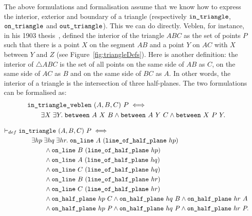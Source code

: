 The above formulations and formalisation assume that we know how to express the interior, exterior and boundary of a triangle (respectively $\texttt{in\_triangle}$, $\texttt{on\_triangle}$ and $\texttt{out\_triangle}$). This we can do directly. Veblen, for instance, in his 1903 thesis~\cite{Veblenphd}, defined the interior of the triangle $ABC$ as the set of points $P$ such that there is a point $X$ on the segment $AB$ and a point $Y$ on $AC$ with $X$ between $Y$ and $Z$ (see Figure~\ref{fig:triangleDefs}). Here is another definition: the interior of $\triangle ABC$ is the set of all points on the same side of $AB$ as $C$, on the same side of $AC$ as $B$ and on the same side of $BC$ as $A$. In other words, the interior of a triangle is the intersection of three half-planes. The two formulations can be formalised as:
\begin{equation*}
\begin{split}
  &\texttt{in\_triangle\_veblen}\ (A,B,C)\ P \iff\\
  &\qquad\exists X\;\exists Y.\; \texttt{between}\ A\ X\ B \wedge \texttt{between}\ A\ Y\ C \wedge \texttt{between}\ X\ P\ Y.
\end{split}
\end{equation*}

\begin{equation}\label{eq:inTriangleDef}
\begin{split}
  \vdash_{def}\;&\code{in\_triangle}\ (A,B,C)\ P \iff\\
    &\qquad\exists hp\;\exists hq\;\exists hr.\;\code{on\_line}\ A\ (\code{line\_of\_half\_plane}\ hp)\\
    &\qquad\qquad\wedge \code{on\_line}\ B\ (\code{line\_of\_half\_plane}\  hp)\\
    &\qquad\qquad\wedge \code{on\_line}\ A\ (\code{line\_of\_half\_plane}\  hq)\\
    &\qquad\qquad\wedge \code{on\_line}\ C\ (\code{line\_of\_half\_plane}\  hq)\\
    &\qquad\qquad\wedge \code{on\_line}\ B\ (\code{line\_of\_half\_plane}\  hr)\\
    &\qquad\qquad\wedge \code{on\_line}\ C\ (\code{line\_of\_half\_plane}\  hr)\\
    &\qquad\qquad\wedge \code{on\_half\_plane}\ hp\ C \wedge \code{on\_half\_plane}\ hq\ B \wedge \code{on\_half\_plane}\ hr\ A\\
    &\qquad\qquad\wedge \code{on\_half\_plane}\ hp\ P \wedge \code{on\_half\_plane}\ hq\ P \wedge \code{on\_half\_plane}\ hr\ P.
\end{split}
\end{equation}

